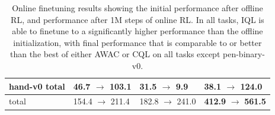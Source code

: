 \documentclass{article} %
\def\ourname{IQL\xspace}
\begin{document}
\begin{table}
\begin{tabular}{ l ||p{1.5cm} |p{1.5cm} | p{1.5cm}  }
    hand-v0 total & \textbf{46.7} \; $\rightarrow$ 103.1 & 31.5 \; $\rightarrow$ 9.9 & 38.1 \; $\rightarrow$ \textbf{124.0} \\ \hline \hline
    total & 154.4 $\rightarrow$ 211.4 & 182.8 $\rightarrow$ 241.0 & \textbf{412.9} $\rightarrow$ \textbf{561.5}
\end{tabular}
\caption{Online finetuning results showing the initial performance after offline RL, and performance after 1M steps of online RL. In all tasks, \ourname is able to finetune to a significantly higher performance than the offline initialization, with final performance that is comparable to or better than the best of either AWAC or CQL on all tasks except pen-binary-v0.}
\label{tab:finetuning}
\end{table}
\end{document}
